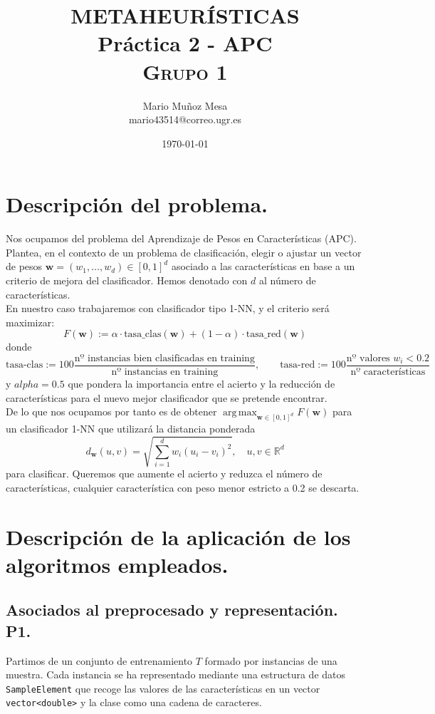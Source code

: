 \documentclass[11pt,a4paper]{article}
\title{
\normalfont \normalsize 
\textsc{\small METAHEURÍSTICAS} \\ [10pt]
	
	
\huge{\textbf{Práctica 2 - APC}}\\

\textsc{\small Grupo 1} \\ [10pt]

	}
\author{Mario Muñoz Mesa\\ mario43514@correo.ugr.es}
\date{\today}
\DeclareMathOperator*{\argmax}{arg\,max}
\theoremstyle{definition}
\newcommand{\R}{\mathbb{R}}
\begin{document}
	\maketitle
	\newpage
	\renewcommand*\contentsname{Índice}	
	\tableofcontents
	
	\newpage
	
	\section{Descripción del problema.}
	Nos ocupamos del problema del Aprendizaje de Pesos en Características (APC). Plantea, en el contexto de un problema de clasificación, elegir o ajustar un vector de pesos $\textbf{w}=(w_1,\ldots, w_d)\in [0,1]^d$ asociado a las características en base a un criterio de mejora del clasificador. Hemos denotado con $d$ al número de características.\\
	
	En nuestro caso trabajaremos con clasificador tipo 1-NN, y el criterio será maximizar:
	$$F(\textbf{w}):=\alpha\cdot \text{tasa\_clas}(\textbf{w})+(1-\alpha ) \cdot \text{tasa\_red}(\textbf{w})$$
	donde
	$$\text{tasa-clas}:=100\frac{\text{nº instancias bien clasificadas en training}}{\text{nº instancias en training}}, \quad \quad \text{tasa-red}:=100\frac{\text{nº valores } w_i <0.2}{\text{nº características}}$$
	y $alpha=0.5$ que pondera la importancia entre el acierto y la reducción de características para el nuevo mejor clasificador que se pretende encontrar.\\
	
	De lo que nos ocupamos por tanto es de obtener $\argmax_{\textbf{w}\in [0,1]^d} F(\textbf{w})$ para un clasificador 1-NN que utilizará la distancia ponderada
	$$d_{\textbf{w}}(u,v)=\sqrt{\sum_{i=1}^d w_i(u_i-v_i)^2}, \quad u,v\in \R^d$$
	para clasificar. Queremos que aumente el acierto y reduzca el número de características, cualquier característica con peso menor estricto a 0.2 se descarta.
	
	
	\newpage
	\section{Descripción de la aplicación de los algoritmos empleados.}
	\subsection{Asociados al preprocesado y representación. P1.}
	Partimos de un conjunto de entrenamiento $T$ formado por instancias de una muestra. Cada instancia se ha representado mediante una estructura de datos \texttt{SampleElement} que recoge las valores de las características en un vector \texttt{vector<double>} y la clase como una cadena de caracteres.
	
\end{document}
